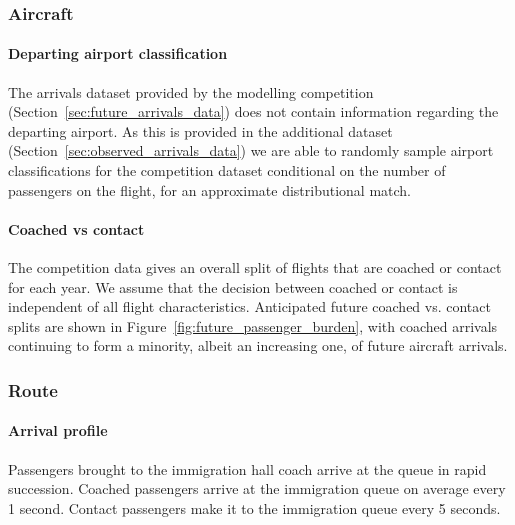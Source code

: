 \documentclass[10pt]{article}
\begin{document}
\subsubsection{Aircraft}

\paragraph{Departing airport classification}
The arrivals dataset provided by the modelling competition (Section~\ref{sec:future_arrivals_data}) does not contain information regarding the departing airport. As this is provided in the additional dataset (Section~\ref{sec:observed_arrivals_data}) we are able to randomly sample airport classifications for the competition dataset conditional on the number of passengers on the flight, for an approximate distributional match. 




\paragraph{Coached vs contact}
The competition data gives an overall split of flights that are coached or contact for each year. We assume that the decision between coached or contact is independent of all flight characteristics. Anticipated future coached vs. contact splits are shown in Figure~\ref{fig:future_passenger_burden}, with coached arrivals continuing to form a minority, albeit an increasing one, of future aircraft arrivals.


\subsubsection{Route}

\paragraph{Arrival profile} 
 Passengers  brought to the immigration hall coach arrive at the queue in rapid succession. Coached passengers arrive at the immigration queue on average every 1 second. Contact passengers make it to the immigration queue every 5 seconds.
\end{document}
